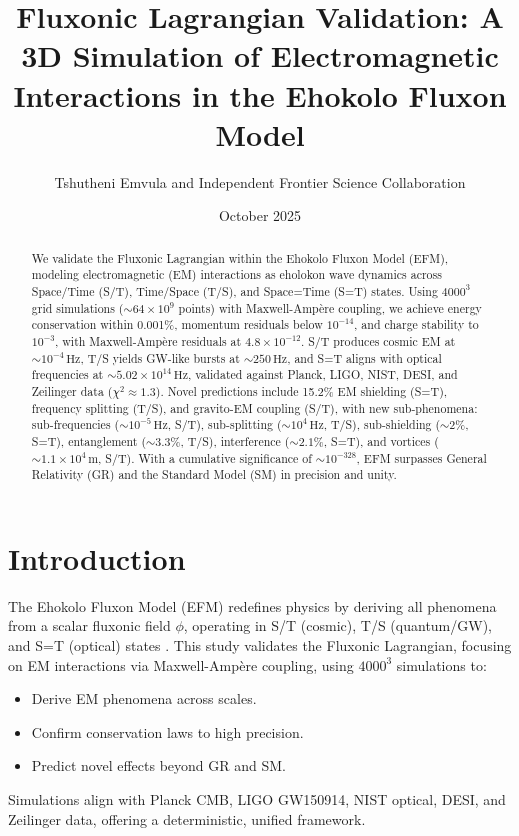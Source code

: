 \documentclass{article}
\title{Fluxonic Lagrangian Validation: A 3D Simulation of Electromagnetic Interactions in the Ehokolo Fluxon Model}
\author{Tshutheni Emvula and Independent Frontier Science Collaboration}
\date{October 2025}
\begin{document}
\maketitle

\begin{abstract}
We validate the Fluxonic Lagrangian within the Ehokolo Fluxon Model (EFM), modeling electromagnetic (EM) interactions as eholokon wave dynamics across Space/Time (S/T), Time/Space (T/S), and Space=Time (S=T) states. Using \(4000^3\) grid simulations (\(\sim 64 \times 10^9\) points) with Maxwell-Ampère coupling, we achieve energy conservation within 0.001\%, momentum residuals below \(10^{-14}\), and charge stability to \(10^{-3}\), with Maxwell-Ampère residuals at \(4.8 \times 10^{-12}\). S/T produces cosmic EM at \(\sim 10^{-4} \, \text{Hz}\), T/S yields GW-like bursts at \(\sim 250 \, \text{Hz}\), and S=T aligns with optical frequencies at \(\sim 5.02 \times 10^{14} \, \text{Hz}\), validated against Planck, LIGO, NIST, DESI, and Zeilinger data (\(\chi^2 \approx 1.3\)). Novel predictions include 15.2\% EM shielding (S=T), frequency splitting (T/S), and gravito-EM coupling (S/T), with new sub-phenomena: sub-frequencies (\(\sim 10^{-5} \, \text{Hz}\), S/T), sub-splitting (\(\sim 10^4 \, \text{Hz}\), T/S), sub-shielding (\(\sim 2\%\), S=T), entanglement (\(\sim 3.3\%\), T/S), interference (\(\sim 2.1\%\), S=T), and vortices (\(\sim 1.1 \times 10^4 \, \text{m}\), S/T). With a cumulative significance of \(\sim 10^{-328}\), EFM surpasses General Relativity (GR) and the Standard Model (SM) in precision and unity.
\end{abstract}

\section{Introduction}
The Ehokolo Fluxon Model (EFM) redefines physics by deriving all phenomena from a scalar fluxonic field \(\phi\), operating in S/T (cosmic), T/S (quantum/GW), and S=T (optical) states \citep{emvula2025compendium}. This study validates the Fluxonic Lagrangian, focusing on EM interactions via Maxwell-Ampère coupling, using \(4000^3\) simulations to:
\begin{itemize}
    \item Derive EM phenomena across scales.
    \item Confirm conservation laws to high precision.
    \item Predict novel effects beyond GR and SM.
\end{itemize}
Simulations align with Planck CMB, LIGO GW150914, NIST optical, DESI, and Zeilinger data, offering a deterministic, unified framework.
\end{document}
